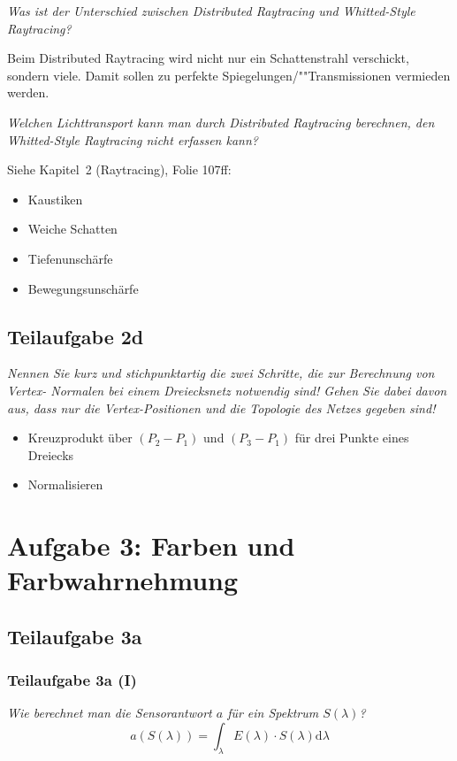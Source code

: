\documentclass[a4paper]{scrartcl}
\begin{document}
\textit{Was ist der Unterschied zwischen Distributed Raytracing und Whitted-Style Raytracing?}

Beim Distributed Raytracing wird nicht nur ein Schattenstrahl verschickt, sondern
viele. Damit sollen zu perfekte Spiegelungen/""Transmissionen vermieden werden.

\textit{Welchen Lichttransport kann man durch Distributed Raytracing berechnen, den
Whitted-Style Raytracing nicht erfassen kann?}

Siehe Kapitel~2 (Raytracing), Folie 107ff:

\begin{itemize}
    \item Kaustiken
    \item Weiche Schatten
    \item Tiefenunschärfe
    \item Bewegungsunschärfe
\end{itemize}

\subsection*{Teilaufgabe 2d}
\textit{Nennen Sie kurz und stichpunktartig die zwei Schritte, die zur Berechnung von Vertex-
Normalen bei einem Dreiecksnetz notwendig sind! Gehen Sie dabei davon aus, dass nur
die Vertex-Positionen und die Topologie des Netzes gegeben sind!}

\begin{itemize}
	\item Kreuzprodukt über $(P_2-P_1)$ und $(P_3 - P_1)$ für drei Punkte eines Dreiecks
	\item Normalisieren
\end{itemize}

\clearpage
\section*{Aufgabe 3: Farben und Farbwahrnehmung}
\subsection*{Teilaufgabe 3a}
\subsubsection*{Teilaufgabe 3a (I)}
\textit{Wie berechnet man die Sensorantwort $a$ für ein Spektrum $S(\lambda)$?}
\[a(S(\lambda)) = \int_\lambda E(\lambda) \cdot S(\lambda) \mathrm{d} \lambda \]
\end{document}
